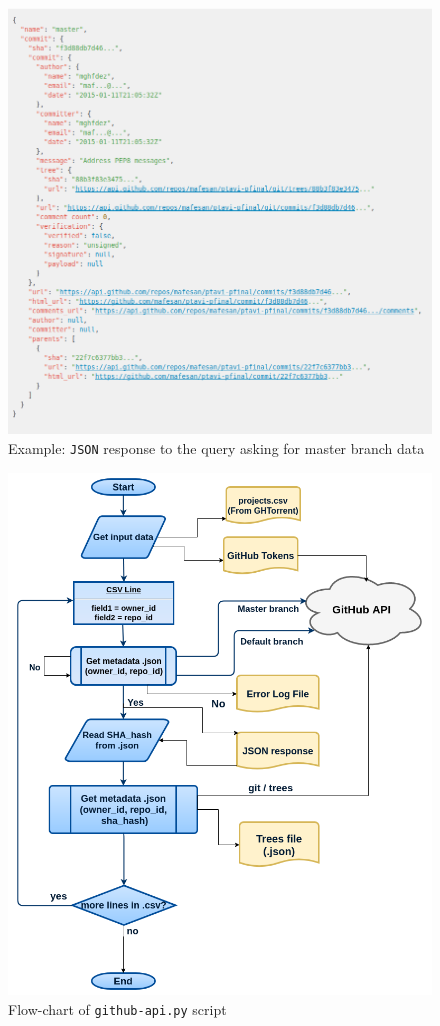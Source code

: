 \documentclass[a4paper, 12pt]{book}
\begin{document}
\begin{figure}
  \centering
  \includegraphics[width=15cm, keepaspectratio]{img/gh-api-master-json-example}
  \caption{Example: \texttt{JSON} response to the query asking for master branch data}
  \label{fig:gh-api-master-json}
\end{figure}
\begin{figure}
  \centering
  \includegraphics[width=14cm, keepaspectratio]{img/github-api}
  \caption{Flow-chart of \texttt{github-api.py} script}
  \label{fig:gh-api-diagram}
\end{figure}
\end{document}
